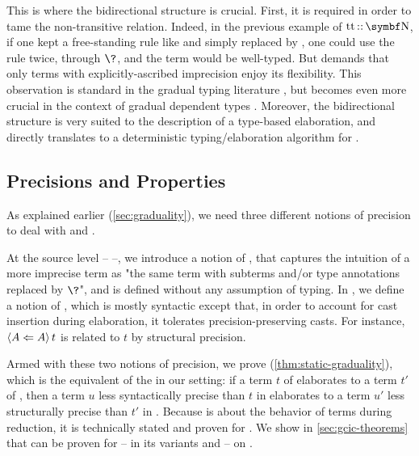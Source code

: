 This is where the bidirectional structure is crucial.
First, it is required in order to tame the non-transitive  relation.
Indeed, in the previous example of $\asc{\true}{\Nat}$, if one kept a free-standing rule like
 and simply replaced  by , one could
use the rule twice, through $\?$, and the term would be well-typed.
But  demands that only terms with explicitly-ascribed
imprecision enjoy its flexibility.
This observation is standard in the gradual typing literature
, but becomes even more crucial in the context of
gradual dependent types .
Moreover, the bidirectional structure is very suited to the description of
a type-based elaboration, and directly translates to a deterministic typing/elaboration
algorithm for .

\subsection{Precisions and Properties}
\label{sec:precision-graduality}

As explained earlier (\cref{sec:graduality}), we need three different notions of
precision to deal with  and .

At the source level –  –,
we introduce a notion of , that captures the
intuition of a more imprecise term as "the same term with subterms and/or
type annotations replaced by $\?$", and is defined without any assumption of typing.
In , we define a notion of ,
which is mostly syntactic except that, in order to account for cast insertion during elaboration, it tolerates precision-preserving casts.
For instance, $\cast{t}{A}{A}$ is related to $t$ by structural precision.

Armed with these two notions of precision, we prove
 (\cref{thm:static-graduality}), which is
the equivalent of the  in our setting:
if a term $t$ of  elaborates to a term $t'$ of ,
then a term $u$ less syntactically precise than $t$ in  elaborates to
a term $u'$ less structurally precise than $t'$ in .
%
Because  is about the behavior of terms during reduction,
it is technically stated and proven for .
We show in \cref{sec:gcic-theorems} that  can be proven
for  – in its variants  and  – on .

